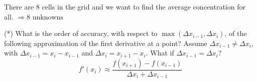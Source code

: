 \begin{solution}
    There are 8 cells in the grid and we want to find the average concentration for all. \(\Rightarrow \boxed{8 \text{ unknowns}}\)
\end{solution}

\begin{exercise} %
    (*) What is the order of accuracy, with respect to
    $\max(\Delta x_{i-1}, \Delta x_i)$, of the following approximation of the
    first derivative at a point?  Assume $\Delta x_{i-1} \neq \Delta x_i$, with
    $\Delta x_{i-1} = x_i - x_{i-1}$ and $\Delta x_i = x_{i+1} - x_i$.
    What if $\Delta x_{i-1} = \Delta x_i$?
    \[
        f'(x_i) \approx
        \frac{f(x_{i+1}) - f(x_{i-1})}{\Delta x_i + \Delta x_{i-1}}
    \]
\end{exercise}

